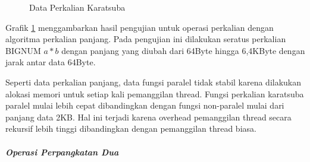     \begin{figure}[h]
      \centering
      \caption{Data Perkalian Karatsuba}
      \label{fig:data_mul_recursive}
    \end{figure}

    Grafik \ref{fig:data_mul_recursive} menggambarkan hasil pengujian untuk operasi perkalian dengan algoritma perkalian panjang. Pada pengujian ini dilakukan seratus perkalian BIGNUM $a * b$ dengan panjang yang diubah dari 64Byte hingga 6,4KByte dengan jarak antar data 64Byte.

    Seperti data perkalian panjang, data fungsi paralel tidak stabil karena dilakukan alokasi memori untuk setiap kali pemanggilan thread. Fungsi perkalian karatsuba paralel mulai lebih cepat dibandingkan dengan fungsi non-paralel mulai dari panjang data 2KB. Hal ini terjadi karena overhead pemanggilan thread secara rekursif lebih tinggi dibandingkan dengan pemanggilan thread biasa.

    \subparagraph{Operasi Perpangkatan Dua}



